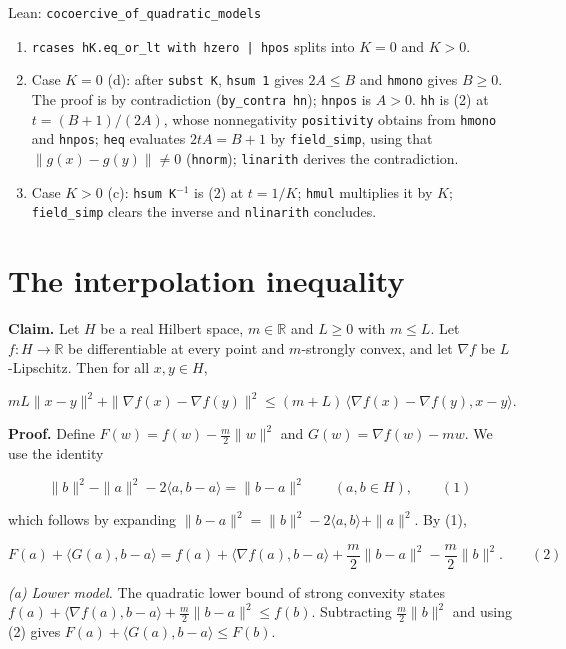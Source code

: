 \documentclass[11pt,a4paper]{article}
\begin{document}
\begin{leanbox}{Lean: \texttt{cocoercive\_\allowbreak{}of\_\allowbreak{}quadratic\_\allowbreak{}models}}
\begin{enumerate}
\item \texttt{rcases h\allowbreak{}K.\allowbreak{}eq\_\allowbreak{}or\_\allowbreak{}lt with hzero | hpos} splits into \(K=0\) and \(K>0\).

\item Case \(K=0\) (d): after \texttt{subst K}, \texttt{hsum 1} gives \(2A\le B\) and \texttt{hmono} gives \(B\ge0\). The proof is by contradiction (\texttt{by\_\allowbreak{}contra hn}); \texttt{hnpos} is \(A>0\). \texttt{hh} is (2) at \(t=(B+1)/(2A)\), whose nonnegativity \texttt{positivity} obtains from \texttt{hmono} and \texttt{hnpos}; \texttt{heq} evaluates \(2tA=B+1\) by \texttt{field\_\allowbreak{}simp}, using that \(\|g(x)-g(y)\|\ne0\) (\texttt{hnorm}); \texttt{linarith} derives the contradiction.

\item Case \(K>0\) (c): \texttt{hsum K\ensuremath{{}^{-1}}} is (2) at \(t=1/K\); \texttt{hmul} multiplies it by \(K\); \texttt{field\_\allowbreak{}simp} clears the inverse and \texttt{nlinarith} concludes.

\end{enumerate}
\end{leanbox}

\section{\texorpdfstring{The interpolation inequality}{The interpolation inequality}}


\textbf{Claim.} Let \(H\) be a real Hilbert space, \(m\in\mathbb R\) and \(L\ge0\) with \(m\le L\). Let \(f:H\to\mathbb R\) be differentiable at every point and \(m\)-strongly convex, and let \(\nabla f\) be \(L\)-Lipschitz. Then for all \(x,y\in H\),


\[mL\|x-y\|^2+\|\nabla f(x)-\nabla f(y)\|^2\le(m+L)\,\langle\nabla f(x)-\nabla f(y),x-y\rangle.\]


\textbf{Proof.} Define \(F(w)=f(w)-\frac m2\|w\|^2\) and \(G(w)=\nabla f(w)-mw\). We use the identity


\[\|b\|^2-\|a\|^2-2\langle a,b-a\rangle=\|b-a\|^2\qquad(a,b\in H),\qquad(1)\]


which follows by expanding \(\|b-a\|^2=\|b\|^2-2\langle a,b\rangle+\|a\|^2\). By (1),


\[F(a)+\langle G(a),b-a\rangle=f(a)+\langle\nabla f(a),b-a\rangle+\frac m2\|b-a\|^2-\frac m2\|b\|^2.\qquad(2)\]


\emph{(a) Lower model.} The quadratic lower bound of strong convexity states \(f(a)+\langle\nabla f(a),b-a\rangle+\frac m2\|b-a\|^2\le f(b)\). Subtracting \(\frac m2\|b\|^2\) and using (2) gives \(F(a)+\langle G(a),b-a\rangle\le F(b)\).
\end{document}
